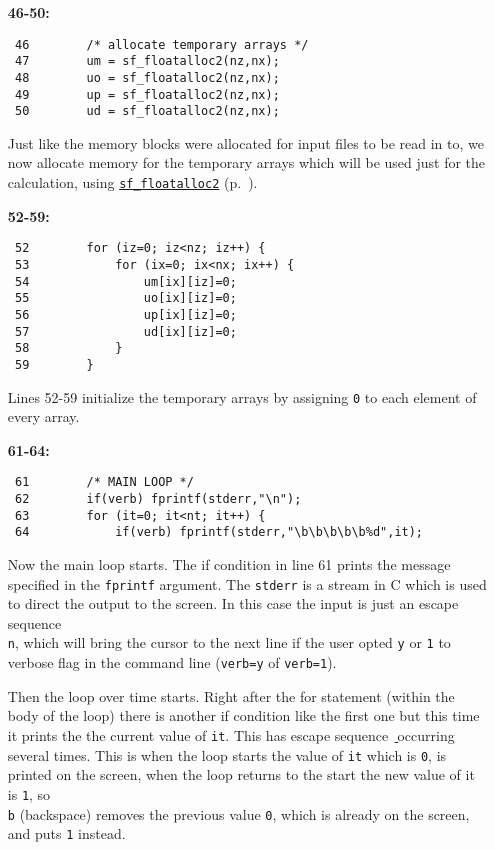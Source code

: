\begin{itemize}
\item [\bf 46-50:]
\begin{verbatim}
 46        /* allocate temporary arrays */
 47        um = sf_floatalloc2(nz,nx);
 48        uo = sf_floatalloc2(nz,nx);
 49        up = sf_floatalloc2(nz,nx);
 50        ud = sf_floatalloc2(nz,nx);
\end{verbatim}

Just like the memory blocks were allocated for input files to be read in to, we now allocate memory for the temporary arrays which will be used just for the calculation, using \hyperref[sec:sf_floatalloc2]{\texttt{sf\_floatalloc2}} (p.~\pageref{sec:sf_floatalloc2}).


\item [\bf 52-59:]
\begin{verbatim}
 52        for (iz=0; iz<nz; iz++) {
 53            for (ix=0; ix<nx; ix++) {
 54                um[ix][iz]=0;
 55                uo[ix][iz]=0;
 56                up[ix][iz]=0;
 57                ud[ix][iz]=0;
 58            }
 59        }
\end{verbatim}
Lines 52-59 initialize the temporary arrays by assigning \texttt{0} to each element of every array.

\item [\bf 61-64:]
\begin{verbatim}
 61        /* MAIN LOOP */
 62        if(verb) fprintf(stderr,"\n");
 63        for (it=0; it<nt; it++) {
 64            if(verb) fprintf(stderr,"\b\b\b\b\b%d",it);
\end{verbatim}
Now the main loop starts. The if condition in line 61 prints the message specified in the \texttt{fprintf} argument. The \texttt{stderr} is a stream in C which is used to direct the output to the screen. In this case the input is just an escape sequence \texttt{\\n}, which will bring the cursor to the next line if the user opted \texttt{y} or \texttt{1} to verbose flag in the command line (\texttt{verb=y} of \texttt{verb=1}).

Then the loop over time starts. Right after the for statement (within the body of the loop) there          is another if condition like the first one but this time it prints the the current value of \texttt{it}. This has escape sequence \texttt{\b} occurring several times. This is when the loop starts the value of \texttt{it} which is \texttt{0}, is printed on the screen, when the loop returns to the start the new value of it is \texttt{1}, so \texttt{\\b} (backspace) removes the previous value \texttt{0}, which is already on the screen, and puts \texttt{1} instead. 


\end{itemize}
